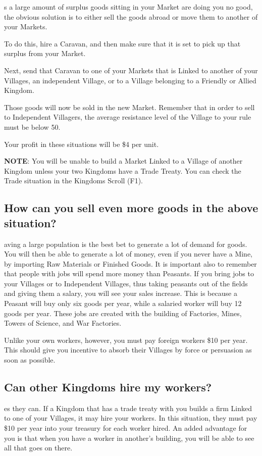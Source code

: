 s a large amount of surplus goods sitting in your Market are doing you no good, the obvious solution is to either sell the goods abroad or move them to another of your Markets.

To do this, hire a Caravan, and then make sure that it is set to pick up that surplus from your Market.


Next, send that Caravan to one of your Markets that is Linked to another of your Villages, an independent Village, or to a Village belonging to a Friendly or Allied Kingdom.

Those goods will now be sold in the new Market. Remember that in order to sell to Independent Villagers, the average resistance level of the Village to your rule must be below 50.

Your profit in these situations will be \$4 per unit.

\textbf{NOTE}: You will be unable to build a Market Linked to a Village of another Kingdom unless your two Kingdoms have a Trade Treaty. You can check the Trade situation in the Kingdoms Scroll (F1).

\subsection{\textsf{How can you sell even more goods in the above situation?}}

aving a large population is the best bet to generate a lot of demand for goods. You will then be able to generate a lot of money, even if you never have a Mine, by importing Raw Materials or Finished Goods. It is important also to remember that people with jobs will spend more money than Peasants. If you bring jobs to your Villages or to Independent Villages, thus taking peasants out of the fields and giving them a salary, you will see your sales increase. This is because a Peasant will buy only six goods per year, while a salaried worker will buy 12 goods per year. These jobs are created with the building of Factories, Mines, Towers of Science, and War Factories.

Unlike your own workers, however, you must pay foreign workers \$10 per year. This should give you incentive to absorb their Villages by force or persuasion as soon as possible.

\subsection{\textsf{Can other Kingdoms hire my workers?}}

es they can. If a Kingdom that has a trade treaty with you builds a firm Linked to one of your Villages, it may hire your workers. In this situation, they must pay \$10 per year into your treasury for each worker hired. An added advantage for you is that when you have a worker in another’s building, you will be able to see all that goes on there.
